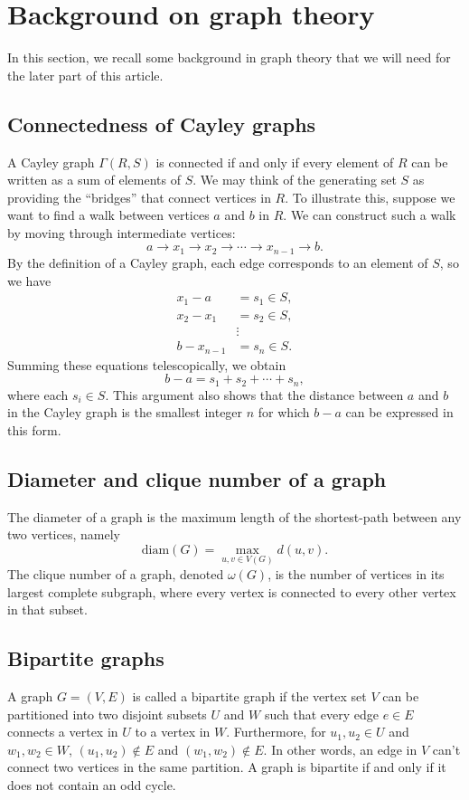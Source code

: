 \documentclass[12pt, a4paper]{amsart}
\theoremstyle{definition}
\numberwithin{equation}{section}
\begin{document}
\section{Background on graph theory} \label{sec:background}
In this section, we recall some background in graph theory that we will need for the later part of this article. 
\subsection{Connectedness of Cayley graphs}
A Cayley graph \(\Gamma(R,S)\) is connected if and only if every element of \(R\) can be written as a sum of elements of \(S\). We may think of the generating set \(S\) as providing the ``bridges'' that connect vertices in \(R\). To illustrate this, suppose we want to find a walk between vertices \(a\) and \(b\) in \(R\). We can construct such a walk by moving through intermediate vertices:
\[
a \to x_1 \to x_2 \to \cdots \to x_{n-1} \to b.
\]
By the definition of a Cayley graph, each edge corresponds to an element of \(S\), so we have
\begin{align*}
x_1 - a &= s_1 \in S, \\
x_2 - x_1 &= s_2 \in S, \\
&\vdots \\
b - x_{n-1} &= s_n \in S.
\end{align*}
Summing these equations telescopically, we obtain
\[
b - a = s_1 + s_2 + \cdots + s_n,
\]
where each \(s_i \in S\). This argument also shows that the distance between \(a\) and \(b\) in the Cayley graph is the smallest integer \(n\) for which \(b-a\) can be expressed in this form.

\subsection{Diameter and clique number of a graph}
The diameter of a graph is the maximum length of the shortest-path between any two vertices, namely 
\[ \text{diam}(G)=\max_{u,v \in V(G)} d(u,v). \]
The clique number of a graph, denoted $\omega(G)$, is the number of vertices in its largest complete subgraph, where every vertex is connected to every other vertex in that subset.

\subsection{Bipartite graphs} 
A graph $G = (V, E)$ is called a bipartite graph if the vertex set $V$ can be partitioned into two disjoint subsets $U$ and $W$ such that every edge  $e \in E$ connects a vertex in $U$ to a vertex in $W$. Furthermore, for $u_1, u_2 \in U$ and $w_1, w_2 \in W$, $(u_1, u_2) \not \in E$ and $(w_1, w_2) \not \in E$. In other words, an edge in $V$ can't connect two vertices in the same partition. A graph is bipartite if and only if it does not contain an odd cycle.
\end{document}
